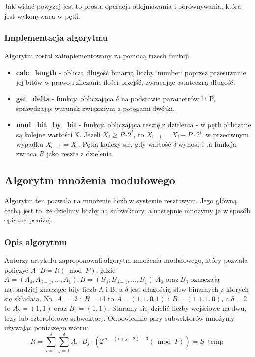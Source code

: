 \documentclass[11pt]{article}
\renewcommand\*{\cdot}
\begin{document}
Jak widać powyżej jest to prosta operacja odejmowania i porównywania, która jest wykonywana w pętli.
\subsubsection{Implementacja algorytmu}
Algorytm został zaimplementowany za pomocą trzech funkcji.
\begin{itemize}
    \item \textbf{calc\_length} - oblicza długość binarną liczby `number` poprzez przesuwanie jej bitów w prawo i zliczanie ilości przejść, zwracając ostateczną długość.
    \item \textbf{get\_delta} - funkcja obliczająca $\delta$ na podstawie parametrów l i P, sprawdzając warunek związanym z potęgami dwójki.
    \item \textbf{mod\_bit\_by\_bit} - funkcja obliczająca resztę z dzielenia - w pętli obliczane są kolejne wartości X.
          Jeżeli $X_i \geq P \cdot 2^i$, to $X_{i-1}=X_i-P \cdot 2^i$, w przeciwnym wypadku $X_{i-1}=X_i$.
          Pętla kończy się, gdy wartość $\delta$ wynosi 0 ,a funkcja zwraca $R$ jako reszte z dzielenia.
\end{itemize}


\subsection{Algorytm mnożenia modułowego}
Algorytm ten pozwala na mnożenie liczb w systemie resztowym. Jego główną cechą jest to, że dzielimy liczby na subwektory, a następnie mnożymy je w sposób opisany poniżej.
\subsubsection{Opis algorytmu}
Autorzy artykułu zaproponowali algorytm mnożenia modułowego, który pozwala policzyć $A \cdot B=R(\bmod P)$, gdzie
$A=\left(A_\delta, A_{\delta-1}, \ldots, A_1\right), B=\left(B_\delta, B_{\delta-1}, \ldots, B_1\right)$  $A_\delta$ oraz $B_\delta$  oznaczają najbardziej znaczące bity liczb A i B, a $\delta$ jest długością słow binarnych z których się składaja.
Np. $A=13$ i $B=14$ to $A=\left(1, 1, 0, 1\right)$ i $B=\left(1, 1, 1, 0\right)$, a $\delta=2$ to $A_2 =\left(1, 1\right)$  oraz $B_2  =\left(1, 1\right)$. Staramy się dzielić liczby wejściowe na dwu, trzy lub czterobitowe  subwektory.
Odpowiednie pary subwektorów mnożymy używając poniższego wzoru:
$$
    R=\sum_{i=1}^\delta \sum_{j=1}^\delta A_i \cdot B_j \cdot\left(2^{m-(i+j-2)-3}(\bmod P)\right)=S_{-} \text {temp }
$$
\end{document}
